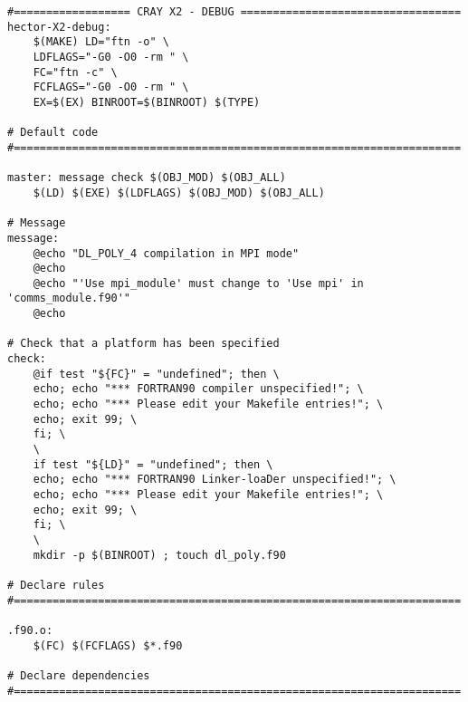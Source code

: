 \begin{verbatim}
#================== CRAY X2 - DEBUG ==================================
hector-X2-debug:
	$(MAKE) LD="ftn -o" \
	LDFLAGS="-G0 -O0 -rm " \
	FC="ftn -c" \
	FCFLAGS="-G0 -O0 -rm " \
	EX=$(EX) BINROOT=$(BINROOT) $(TYPE)

# Default code
#=====================================================================

master: message check $(OBJ_MOD) $(OBJ_ALL)
	$(LD) $(EXE) $(LDFLAGS) $(OBJ_MOD) $(OBJ_ALL)

# Message
message:
	@echo "DL_POLY_4 compilation in MPI mode"
	@echo
	@echo "'Use mpi_module' must change to 'Use mpi' in 'comms_module.f90'"
	@echo

# Check that a platform has been specified
check:
	@if test "${FC}" = "undefined"; then \
	echo; echo "*** FORTRAN90 compiler unspecified!"; \
	echo; echo "*** Please edit your Makefile entries!"; \
	echo; exit 99; \
	fi; \
	\
	if test "${LD}" = "undefined"; then \
	echo; echo "*** FORTRAN90 Linker-loaDer unspecified!"; \
	echo; echo "*** Please edit your Makefile entries!"; \
	echo; exit 99; \
	fi; \
	\
	mkdir -p $(BINROOT) ; touch dl_poly.f90

# Declare rules
#=====================================================================

.f90.o:
	$(FC) $(FCFLAGS) $*.f90

# Declare dependencies
#=====================================================================


\end{verbatim}
